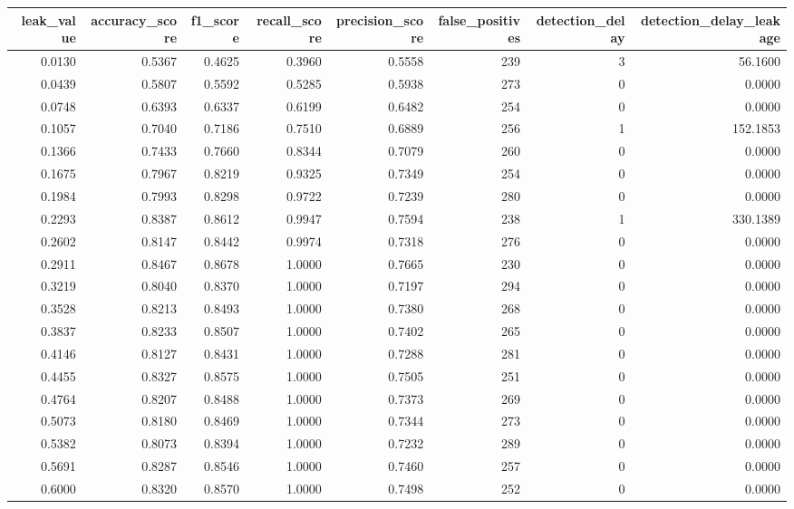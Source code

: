 \begin{tabular}{rrrrrrrr}
\toprule
leak\_value & accuracy\_score & f1\_score & recall\_score & precision\_score & false\_positives & detection\_delay & detection\_delay\_leakage \\
\midrule
0.0130 & 0.5367 & 0.4625 & 0.3960 & 0.5558 & 239 & 3 & 56.1600 \\
0.0439 & 0.5807 & 0.5592 & 0.5285 & 0.5938 & 273 & 0 & 0.0000 \\
0.0748 & 0.6393 & 0.6337 & 0.6199 & 0.6482 & 254 & 0 & 0.0000 \\
0.1057 & 0.7040 & 0.7186 & 0.7510 & 0.6889 & 256 & 1 & 152.1853 \\
0.1366 & 0.7433 & 0.7660 & 0.8344 & 0.7079 & 260 & 0 & 0.0000 \\
0.1675 & 0.7967 & 0.8219 & 0.9325 & 0.7349 & 254 & 0 & 0.0000 \\
0.1984 & 0.7993 & 0.8298 & 0.9722 & 0.7239 & 280 & 0 & 0.0000 \\
0.2293 & 0.8387 & 0.8612 & 0.9947 & 0.7594 & 238 & 1 & 330.1389 \\
0.2602 & 0.8147 & 0.8442 & 0.9974 & 0.7318 & 276 & 0 & 0.0000 \\
0.2911 & 0.8467 & 0.8678 & 1.0000 & 0.7665 & 230 & 0 & 0.0000 \\
0.3219 & 0.8040 & 0.8370 & 1.0000 & 0.7197 & 294 & 0 & 0.0000 \\
0.3528 & 0.8213 & 0.8493 & 1.0000 & 0.7380 & 268 & 0 & 0.0000 \\
0.3837 & 0.8233 & 0.8507 & 1.0000 & 0.7402 & 265 & 0 & 0.0000 \\
0.4146 & 0.8127 & 0.8431 & 1.0000 & 0.7288 & 281 & 0 & 0.0000 \\
0.4455 & 0.8327 & 0.8575 & 1.0000 & 0.7505 & 251 & 0 & 0.0000 \\
0.4764 & 0.8207 & 0.8488 & 1.0000 & 0.7373 & 269 & 0 & 0.0000 \\
0.5073 & 0.8180 & 0.8469 & 1.0000 & 0.7344 & 273 & 0 & 0.0000 \\
0.5382 & 0.8073 & 0.8394 & 1.0000 & 0.7232 & 289 & 0 & 0.0000 \\
0.5691 & 0.8287 & 0.8546 & 1.0000 & 0.7460 & 257 & 0 & 0.0000 \\
0.6000 & 0.8320 & 0.8570 & 1.0000 & 0.7498 & 252 & 0 & 0.0000 \\
\bottomrule
\end{tabular}
